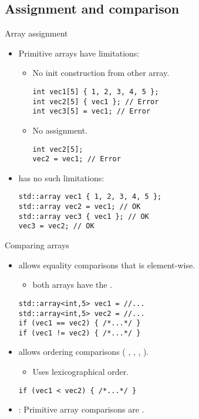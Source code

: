 \subsection{Assignment and comparison}

\begin{frame}[t,fragile]{Array assignment}
\begin{itemize}
  \item Primitive arrays have limitations:
    \begin{itemize}
      \item No init construction from other array.
\begin{lstlisting}
int vec1[5] { 1, 2, 3, 4, 5 };
int vec2[5] { vec1 }; // Error
int vec3[5] = vec1; // Error
\end{lstlisting}
      \item No assignment.
\begin{lstlisting}
int vec2[5];
vec2 = vec1; // Error
\end{lstlisting}
    \end{itemize}

  \item {} has no such limitations:
\begin{lstlisting}
std::array vec1 { 1, 2, 3, 4, 5 };
std::array vec2 = vec1; // OK
std::array vec3 { vec1 }; // OK
vec3 = vec2; // OK
\end{lstlisting}
\end{itemize}
\end{frame}

\begin{frame}[t,fragile]{Comparing arrays}
\begin{itemize}
  \item {} allows equality comparisons that is element-wise.
    \begin{itemize}
      \item {} both arrays have the .
    \end{itemize}
\begin{lstlisting}
std::array<int,5> vec1 = //...
std::array<int,5> vec2 = //...
if (vec1 == vec2) { /*...*/ }
if (vec1 != vec2) { /*...*/ }
\end{lstlisting}

  \item {} allows ordering comparisons (
        \cppkey{<}, \cppkey{<=}, \cppkey{>}, \cppkey{>=}).
    \begin{itemize}
      \item Uses lexicographical order.
    \end{itemize}
\begin{lstlisting}
if (vec1 < vec2) { /*...*/ }
\end{lstlisting}

  \item {}: Primitive array comparisons are .
\end{itemize}
\end{frame}
